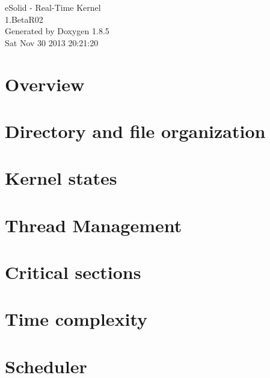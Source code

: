 \documentclass[twoside]{article}
\begin{document}
\hypersetup{pageanchor=false}
\begin{titlepage}
\vspace*{7cm}
\begin{center}%
{\Large e\-Solid -\/ Real-\/\-Time Kernel \\[1ex]\large 1.\-Beta\-R02 }\\
\vspace*{1cm}
{\large Generated by Doxygen 1.8.5}\\
\vspace*{0.5cm}
{\small Sat Nov 30 2013 20:21:20}\\
\end{center}
\end{titlepage}
\tableofcontents
{}
\hypersetup{pageanchor=true}

\section{Overview}
\label{index}\hypertarget{index}{}
\section{Directory and file organization}
\label{files_org}
\hypertarget{files_org}{}

\section{Kernel states}
\label{states}
\hypertarget{states}{}

\section{Thread Management}
\label{threads}
\hypertarget{threads}{}

\section{Critical sections}
\label{critical_section}
\hypertarget{critical_section}{}

\section{Time complexity}
\label{time_complexity}
\hypertarget{time_complexity}{}

\section{Scheduler}
\label{scheduler}
\hypertarget{scheduler}{}

\end{document}

